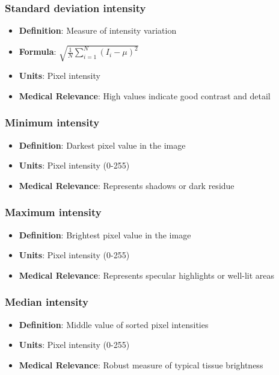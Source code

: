 \documentclass[11pt]{article}
\begin{document}
\subsubsection{Standard deviation intensity}
\begin{itemize}
    \item \textbf{Definition}: Measure of intensity variation
    \item \textbf{Formula}: $\displaystyle \sqrt{\frac{1}{N}\sum_{i=1}^N (I_i - \mu)^2}$
    \item \textbf{Units}: Pixel intensity
    \item \textbf{Medical Relevance}: High values indicate good contrast and detail
\end{itemize}

\subsubsection{Minimum intensity}
\begin{itemize}
    \item \textbf{Definition}: Darkest pixel value in the image
    \item \textbf{Units}: Pixel intensity (0-255)
    \item \textbf{Medical Relevance}: Represents shadows or dark residue
\end{itemize}

\subsubsection{Maximum intensity}
\begin{itemize}
    \item \textbf{Definition}: Brightest pixel value in the image
    \item \textbf{Units}: Pixel intensity (0-255)
    \item \textbf{Medical Relevance}: Represents specular highlights or well-lit areas
\end{itemize}

\subsubsection{Median intensity}
\begin{itemize}
    \item \textbf{Definition}: Middle value of sorted pixel intensities
    \item \textbf{Units}: Pixel intensity (0-255)
    \item \textbf{Medical Relevance}: Robust measure of typical tissue brightness
\end{itemize}
\end{document}
